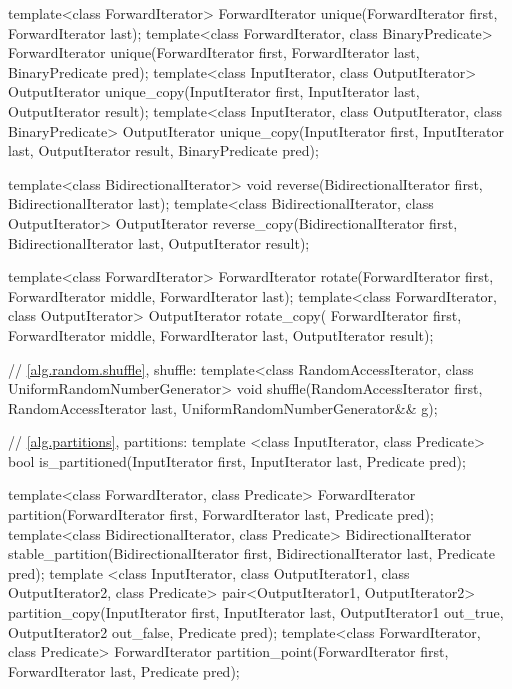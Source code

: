 \begin{codeblock}
{  template<class ForwardIterator>
    ForwardIterator unique(ForwardIterator first, ForwardIterator last);
  template<class ForwardIterator, class BinaryPredicate>
    ForwardIterator unique(ForwardIterator first, ForwardIterator last,
                           BinaryPredicate pred);
  template<class InputIterator, class OutputIterator>
    OutputIterator unique_copy(InputIterator first, InputIterator last,
                               OutputIterator result);
  template<class InputIterator, class OutputIterator, class BinaryPredicate>
    OutputIterator unique_copy(InputIterator first, InputIterator last,
                               OutputIterator result, BinaryPredicate pred);

  template<class BidirectionalIterator>
    void reverse(BidirectionalIterator first, BidirectionalIterator last);
  template<class BidirectionalIterator, class OutputIterator>
    OutputIterator reverse_copy(BidirectionalIterator first,
                                BidirectionalIterator last,
                                OutputIterator result);

  template<class ForwardIterator>
    ForwardIterator rotate(ForwardIterator first, ForwardIterator middle,
                           ForwardIterator last);
  template<class ForwardIterator, class OutputIterator>
    OutputIterator rotate_copy(
      ForwardIterator first, ForwardIterator middle,
      ForwardIterator last, OutputIterator result);

  // \ref{alg.random.shuffle}, shuffle:
  template<class RandomAccessIterator, class UniformRandomNumberGenerator>
    void shuffle(RandomAccessIterator first,
                        RandomAccessIterator last,
                        UniformRandomNumberGenerator&& g);

  // \ref{alg.partitions}, partitions:
  template <class InputIterator, class Predicate>
    bool is_partitioned(InputIterator first, InputIterator last, Predicate pred);

  template<class ForwardIterator, class Predicate>
    ForwardIterator partition(ForwardIterator first,
                              ForwardIterator last,
                              Predicate pred);
  template<class BidirectionalIterator, class Predicate>
    BidirectionalIterator stable_partition(BidirectionalIterator first,
                                           BidirectionalIterator last,
                                           Predicate pred);
  template <class InputIterator, class OutputIterator1,
            class OutputIterator2, class Predicate>
    pair<OutputIterator1, OutputIterator2>
    partition_copy(InputIterator first, InputIterator last,
                   OutputIterator1 out_true, OutputIterator2 out_false,
                   Predicate pred);
  template<class ForwardIterator, class Predicate>
    ForwardIterator partition_point(ForwardIterator first,
                                    ForwardIterator last,
                                    Predicate pred);

}
\end{codeblock}
